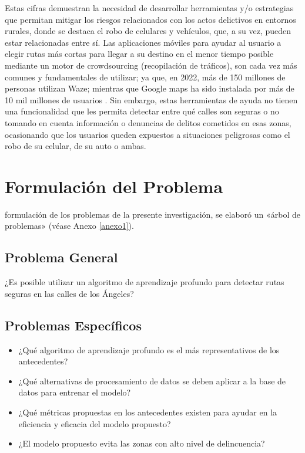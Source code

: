 Estas cifras demuestran la necesidad de desarrollar herramientas y/o estrategias que permitan mitigar los riesgos relacionados con los actos delictivos en entornos rurales, donde se destaca el robo de celulares y vehículos, que, a su vez, pueden estar relacionadas entre sí. Las aplicaciones móviles para ayudar al usuario a elegir rutas más cortas para llegar a su destino en el menor tiempo posible mediante un motor de crowdsourcing (recopilación de tráficos), son cada vez más comunes y fundamentales de utilizar; ya que, en 2022, más de 150 millones de personas utilizan Waze; mientras que Google maps ha sido instalada por más de 10 mil millones de usuarios \parencite{cu_luishernan}. Sin embargo, estas herramientas de ayuda no tienen una funcionalidad que les permita detectar entre qué calles son seguras o no tomando en cuenta información o denuncias de delitos cometidos en esas zonas, ocasionando que los usuarios queden expuestos a situaciones peligrosas como el robo de su celular, de su auto o ambas. 



\section{Formulación del Problema}

 formulación de los problemas de la presente investigación, se elaboró un «árbol de problemas» (véase Anexo \ref{anexo1}). 

\subsection{Problema General}
\newcommand{\ProblemaGeneral}{
	¿Es posible utilizar un algoritmo de aprendizaje profundo para detectar rutas seguras en las calles de los Ángeles? 
}
\ProblemaGeneral
\subsection{Problemas Espec\'{i}ficos}
\newcommand{\Pbone}{
¿Qué algoritmo de aprendizaje profundo es el más representativos de los antecedentes?
}
\newcommand{\Pbtwo}{
¿Qué alternativas de procesamiento de datos se deben aplicar a la base de datos para entrenar el modelo?
}
\newcommand{\Pbthree}{
¿Qué métricas propuestas en los antecedentes existen para ayudar en la eficiencia y eficacia del modelo propuesto?
}
\newcommand{\Pbfour}{
¿El modelo propuesto evita las zonas con alto nivel de delincuencia?
}

\begin{itemize}
	\item \Pbone
	\item \Pbtwo
	\item \Pbthree
	\item \Pbfour
\end{itemize}

